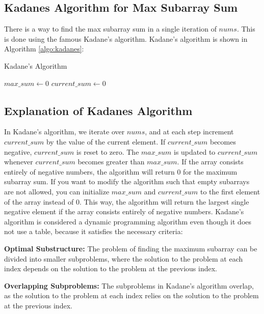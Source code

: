     
\subsection{Kadanes Algorithm for Max Subarray Sum}
    
There is a way to find the max subarray sum in a single iteration of $nums$.
This is done using the famous Kadane's algorithm.
Kadane's algorithm is shown in Algorithm \ref{algo:kadanes}: 

\begin{algorithm}[H]
    \caption{Kadane's Algorithm}
    \label{algo:kadanes}
    $max\_sum \leftarrow 0$\;
    $current\_sum \leftarrow 0$\;
\end{algorithm}
\subsection*{Explanation of Kadanes Algorithm}
In Kadane's algorithm, we iterate over $nums$, and at each step increment $current\_sum$ by the value of the current element. 
If $current\_sum$ becomes negative, $current\_sum$ is reset to zero. 
The $max\_sum$ is updated to $current\_sum$ whenever $current\_sum$ becomes greater than $max\_sum$.
If the array consists entirely of negative numbers, the algorithm will return 0 for the maximum subarray sum.
If you want to modify the algorithm such that empty subarrays are not allowed, you can initialize $max\_sum$ and $current\_sum$ to the first element of the array instead of 0.
This way, the algorithm will return the largest single negative element if the array consists entirely of negative numbers.
Kadane's algorithm is considered a dynamic programming algorithm even though it does not use a table, because it satisfies the necessary criteria:

\textbf{Optimal Substructure:} The problem of finding the maximum subarray can be divided into smaller subproblems, where the solution to the problem at each index depends on the solution to the problem at the previous index.

\textbf{Overlapping Subproblems:} The subproblems in Kadane's algorithm overlap, as the solution to the problem at each index relies on the solution to the problem at the previous index.

